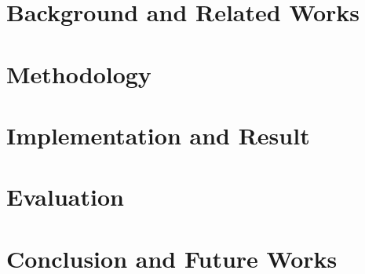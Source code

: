 \documentclass[12pt, twoside]{report}
\makeatletter
\newcommand\AppendixName{Appendix}
\let\oldappendix\appendix
\renewcommand{\appendix}{%
  \oldappendix
  \renewcommand{\chaptername}{\AppendixName}  \renewcommand{\thechapter}{\@Alph\c@chapter}}
\makeatother
\begin{document}
\chapter{Background and Related Works}



\chapter{Methodology}


\chapter{Implementation and Result}


\chapter{Evaluation}


\chapter{Conclusion and Future Works}






\appendix

\end{document}
